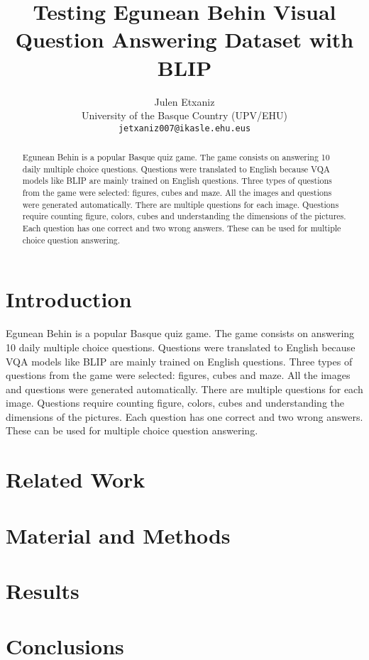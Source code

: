\documentclass[11pt]{article}
\title{Testing Egunean Behin Visual Question Answering Dataset with BLIP}
\author{Julen Etxaniz \\
  University of the Basque Country (UPV/EHU) \\
  \texttt{jetxaniz007@ikasle.ehu.eus}}
\begin{document}
\maketitle
\begin{abstract}
Egunean Behin is a popular Basque quiz game. The game consists on answering 10 daily multiple choice questions.
Questions were translated to English because VQA models like BLIP are mainly trained on English questions.
Three types of questions from the game were selected: figures, cubes and maze. All the images and questions were generated automatically.
There are multiple questions for each image. Questions require counting figure, colors, cubes and understanding the dimensions of the pictures.
Each question has one correct and two wrong answers. These can be used for multiple choice question answering.
\end{abstract}

\section{Introduction}

Egunean Behin is a popular Basque quiz game. The game consists on answering 10 daily multiple choice questions.
Questions were translated to English because VQA models like BLIP \cite{li2022blip} are mainly trained on English questions.
Three types of questions from the game were selected: figures, cubes and maze. All the images and questions were generated automatically.
There are multiple questions for each image. Questions require counting figure, colors, cubes and understanding the dimensions of the pictures.
Each question has one correct and two wrong answers. These can be used for multiple choice question answering.

\section{Related Work}

\section{Material and Methods}

\section{Results}

\section{Conclusions}



\end{document}
